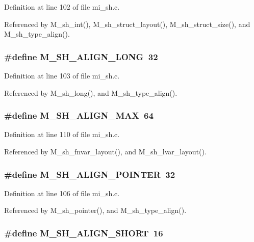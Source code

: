 Definition at line 102 of file mi\_\-sh.c.

Referenced by M\_\-sh\_\-int(), M\_\-sh\_\-struct\_\-layout(), M\_\-sh\_\-struct\_\-size(), and M\_\-sh\_\-type\_\-align().
\subsubsection{\setlength{\rightskip}{0pt plus 5cm}\#define M\_\-SH\_\-ALIGN\_\-LONG~32}\label{mi__sh_8c_37f10235f78448be301019a167a45bbf}




Definition at line 103 of file mi\_\-sh.c.

Referenced by M\_\-sh\_\-long(), and M\_\-sh\_\-type\_\-align().
\subsubsection{\setlength{\rightskip}{0pt plus 5cm}\#define M\_\-SH\_\-ALIGN\_\-MAX~64}\label{mi__sh_8c_4e881268fa91db34b855fb03219a4576}




Definition at line 110 of file mi\_\-sh.c.

Referenced by M\_\-sh\_\-fnvar\_\-layout(), and M\_\-sh\_\-lvar\_\-layout().
\subsubsection{\setlength{\rightskip}{0pt plus 5cm}\#define M\_\-SH\_\-ALIGN\_\-POINTER~32}\label{mi__sh_8c_4d1c2fb4334926fac82ae56d16873bab}




Definition at line 106 of file mi\_\-sh.c.

Referenced by M\_\-sh\_\-pointer(), and M\_\-sh\_\-type\_\-align().
\subsubsection{\setlength{\rightskip}{0pt plus 5cm}\#define M\_\-SH\_\-ALIGN\_\-SHORT~16}\label{mi__sh_8c_86e4b0c9e8a4d992efe1f3ac5c8ad8cf}




